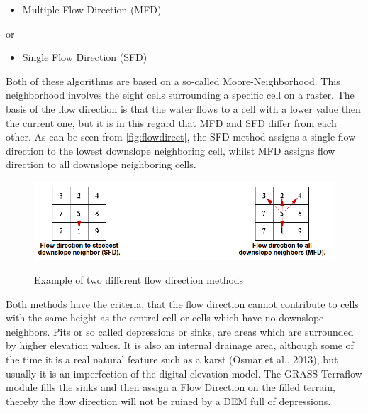 \begin{itemize}
\item Multiple Flow Direction (MFD) 
\end{itemize}
or 
\begin{itemize}
\item Single Flow Direction (SFD)
\end{itemize}
 
Both of these algorithms are based on a so-called Moore-Neighborhood. This neighborhood involves the eight cells surrounding a specific cell on a raster. The basis of the flow direction is that the water flows to a cell with a lower value then the current one, but it is in this regard that MFD and SFD differ from each other. As can be seen from \autoref{fig:flowdirect}, the SFD method assigns a single flow direction to the lowest downslope neighboring cell, whilst MFD assigns flow direction to all downslope neighboring cells. \\

\begin{figure}[t]
\centering
	{\includegraphics[width=\linewidth]{gfx/SFD_MFD.png}}
\caption{Example of two different flow direction methods}
\label{fig:flowdirect}
\end{figure}

Both methods have the criteria, that the flow direction cannot contribute to cells with the same height as the central cell or cells which have no downslope neighbors.
Pits or so called depressions or sinks, are areas which are surrounded by higher elevation values. It is also an internal drainage area, although some of the time it is a real natural feature such as a karst (Osmar et al., 2013), but usually it is an imperfection of the digital elevation model.  The GRASS Terraflow module fills the sinks and then assign a Flow Direction on the filled terrain, thereby the flow direction will not be ruined by a DEM full of depressions. 

